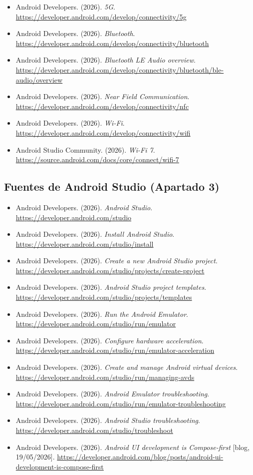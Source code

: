 \documentclass[11pt,a4paper]{article}
\begin{document}
{\begin{itemize}[leftmargin=*,itemsep=0.1em,label={}]
			\item Android Developers. (2026). \emph{5G}. \url{https://developer.android.com/develop/connectivity/5g}
			\item Android Developers. (2026). \emph{Bluetooth}. \url{https://developer.android.com/develop/connectivity/bluetooth}
			\item Android Developers. (2026). \emph{Bluetooth LE Audio overview}. \url{https://developer.android.com/develop/connectivity/bluetooth/ble-audio/overview}
			\item Android Developers. (2026). \emph{Near Field Communication}. \url{https://developer.android.com/develop/connectivity/nfc}
			\item Android Developers. (2026). \emph{Wi-Fi}. \url{https://developer.android.com/develop/connectivity/wifi}
			\item Android Studio Community. (2026). \emph{Wi-Fi 7}. \url{https://source.android.com/docs/core/connect/wifi-7}
		\end{itemize}
	}
	
	\subsection*{Fuentes de Android Studio (Apartado 3)}
	{\small
		\begin{itemize}[leftmargin=*,itemsep=0.1em,label={}]
			\item Android Developers. (2026). \emph{Android Studio}. \url{https://developer.android.com/studio}
			\item Android Developers. (2026). \emph{Install Android Studio}. \url{https://developer.android.com/studio/install}
			\item Android Developers. (2026). \emph{Create a new Android Studio project}. \url{https://developer.android.com/studio/projects/create-project}
			\item Android Developers. (2026). \emph{Android Studio project templates}. \url{https://developer.android.com/studio/projects/templates}
			\item Android Developers. (2026). \emph{Run the Android Emulator}. \url{https://developer.android.com/studio/run/emulator}
			\item Android Developers. (2026). \emph{Configure hardware acceleration}. \url{https://developer.android.com/studio/run/emulator-acceleration}
			\item Android Developers. (2026). \emph{Create and manage Android virtual devices}. \url{https://developer.android.com/studio/run/managing-avds}
			\item Android Developers. (2026). \emph{Android Emulator troubleshooting}. \url{https://developer.android.com/studio/run/emulator-troubleshooting}
			\item Android Developers. (2026). \emph{Android Studio troubleshooting}. \url{https://developer.android.com/studio/troubleshoot}
			\item Android Developers. (2026). \emph{Android UI development is Compose-first} [blog, 19/05/2026]. \url{https://developer.android.com/blog/posts/android-ui-development-is-compose-first}
		\end{itemize}
	}
	
\end{document}
